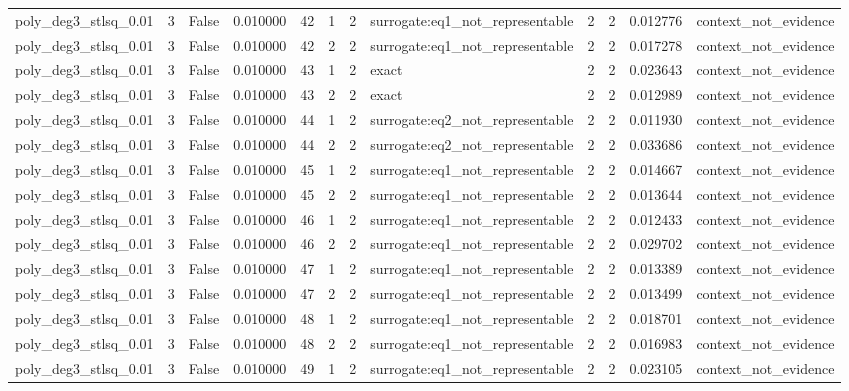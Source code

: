 \begin{tabular}{lrrrrrrlrrrl}
poly\_deg3\_stlsq\_0.01 & 3 & False & 0.010000 & 42 & 1 & 2 & surrogate:eq1\_not\_representable & 2 & 2 & 0.012776 & context\_not\_evidence \\
poly\_deg3\_stlsq\_0.01 & 3 & False & 0.010000 & 42 & 2 & 2 & surrogate:eq1\_not\_representable & 2 & 2 & 0.017278 & context\_not\_evidence \\
poly\_deg3\_stlsq\_0.01 & 3 & False & 0.010000 & 43 & 1 & 2 & exact & 2 & 2 & 0.023643 & context\_not\_evidence \\
poly\_deg3\_stlsq\_0.01 & 3 & False & 0.010000 & 43 & 2 & 2 & exact & 2 & 2 & 0.012989 & context\_not\_evidence \\
poly\_deg3\_stlsq\_0.01 & 3 & False & 0.010000 & 44 & 1 & 2 & surrogate:eq2\_not\_representable & 2 & 2 & 0.011930 & context\_not\_evidence \\
poly\_deg3\_stlsq\_0.01 & 3 & False & 0.010000 & 44 & 2 & 2 & surrogate:eq2\_not\_representable & 2 & 2 & 0.033686 & context\_not\_evidence \\
poly\_deg3\_stlsq\_0.01 & 3 & False & 0.010000 & 45 & 1 & 2 & surrogate:eq1\_not\_representable & 2 & 2 & 0.014667 & context\_not\_evidence \\
poly\_deg3\_stlsq\_0.01 & 3 & False & 0.010000 & 45 & 2 & 2 & surrogate:eq1\_not\_representable & 2 & 2 & 0.013644 & context\_not\_evidence \\
poly\_deg3\_stlsq\_0.01 & 3 & False & 0.010000 & 46 & 1 & 2 & surrogate:eq1\_not\_representable & 2 & 2 & 0.012433 & context\_not\_evidence \\
poly\_deg3\_stlsq\_0.01 & 3 & False & 0.010000 & 46 & 2 & 2 & surrogate:eq1\_not\_representable & 2 & 2 & 0.029702 & context\_not\_evidence \\
poly\_deg3\_stlsq\_0.01 & 3 & False & 0.010000 & 47 & 1 & 2 & surrogate:eq1\_not\_representable & 2 & 2 & 0.013389 & context\_not\_evidence \\
poly\_deg3\_stlsq\_0.01 & 3 & False & 0.010000 & 47 & 2 & 2 & surrogate:eq1\_not\_representable & 2 & 2 & 0.013499 & context\_not\_evidence \\
poly\_deg3\_stlsq\_0.01 & 3 & False & 0.010000 & 48 & 1 & 2 & surrogate:eq1\_not\_representable & 2 & 2 & 0.018701 & context\_not\_evidence \\
poly\_deg3\_stlsq\_0.01 & 3 & False & 0.010000 & 48 & 2 & 2 & surrogate:eq1\_not\_representable & 2 & 2 & 0.016983 & context\_not\_evidence \\
poly\_deg3\_stlsq\_0.01 & 3 & False & 0.010000 & 49 & 1 & 2 & surrogate:eq1\_not\_representable & 2 & 2 & 0.023105 & context\_not\_evidence \\

\end{tabular}
